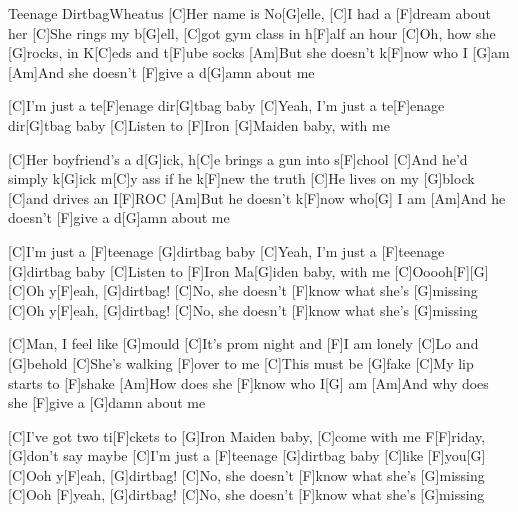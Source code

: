 \documentclass[../main.tex]{subfiles}
\begin{document}
\begin{song}[4]{Teenage Dirtbag}{Wheatus}{}
[C]Her name is No[G]elle, [C]I had a [F]dream about her
[C]She rings my b[G]ell, [C]got gym class in h[F]alf an hour
[C]Oh, how she [G]rocks, in K[C]eds and t[F]ube socks
[Am]But she doesn't k[F]now who I [G]am
[Am]And she doesn't [F]give a d[G]amn about me

[C]I'm just a te[F]enage dir[G]tbag baby
[C]Yeah, I'm just a te[F]enage dir[G]tbag baby
[C]Listen to [F]Iron [G]Maiden baby, with me

[C]Her boyfriend's a d[G]ick, h[C]e brings a gun into s[F]chool
[C]And he'd simply k[G]ick m[C]y ass if he k[F]new the truth
[C]He lives on my [G]block [C]and drives an I[F]ROC
[Am]But he doesn't k[F]now who[G] I am
[Am]And he doesn't [F]give a d[G]amn about me

[C]I'm just a [F]teenage [G]dirtbag baby
[C]Yeah, I'm just a [F]teenage [G]dirtbag baby
[C]Listen to [F]Iron Ma[G]iden baby, with me [C]Ooooh[F]{\hh}[G]{\hh}
[C]Oh y[F]eah, [G]dirtbag! [C]No, she doesn't [F]know what she's [G]missing
[C]Oh y[F]eah, [G]dirtbag! [C]No, she doesn't [F]know what she's [G]missing

[C]Man, I feel like [G]mould
[C]It's prom night and [F]I am lonely
[C]Lo and [G]behold
[C]She's walking [F]over to me
[C]This must be [G]fake
[C]My lip starts to [F]shake
[Am]How does she [F]know who I[G] am
[Am]And why does she [F]give a [G]damn about me

[C]I've got two ti[F]ckets to [G]Iron Maiden baby, [C]come with me F[F]riday, [G]don't say maybe
[C]I'm just a [F]teenage [G]dirtbag baby [C]like [F]you[G]{\hh}
[C]Ooh y[F]eah, [G]dirtbag! [C]No, she doesn't [F]know what she's [G]missing
[C]Ooh [F]yeah, [G]dirtbag! [C]No, she doesn't [F]know what she's [G]missing

\end{song}
\end{document}
